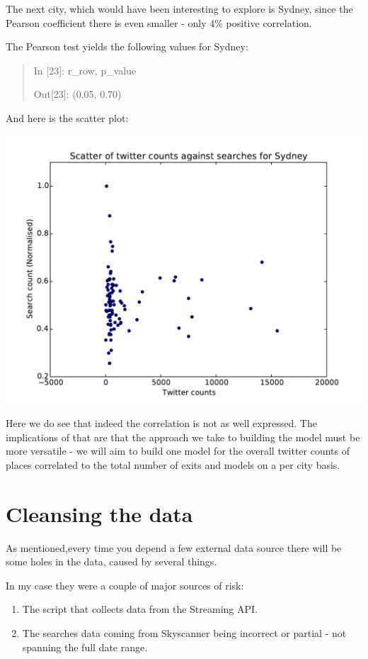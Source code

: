 \documentclass[minf,frontabs,twoside,singlespacing,parskip]{infthesis}
\begin{document}
The next city, which would have been interesting to explore is Sydney, since the Pearson coefficient there is even smaller - only 4\% positive correlation. 

The Pearson test yields the following values for Sydney:
\begin{quotation}
In [23]: r\_row, p\_value

Out[23]: (0.05, 0.70)
\end{quotation}
\newpage
And here is the scatter plot:

\includegraphics[width=\textwidth]{Sydney_scatter}

Here we do see that indeed the correlation is not as well expressed. The implications of that are that the approach we take to building the model must be more versatile - we will aim to build one model for the overall twitter counts of places correlated to the total number of exits and models on a per city basis.

\section{Cleansing the data}

As mentioned,every time you depend a few external data source there will be some holes in the data, caused by several things. 

In my case they were a couple of major sources of risk:
\begin{enumerate}
\item The script that collects data from the Streaming API.
\item The searches data coming from Skyscanner being incorrect or partial - not spanning the full date range.
\end{enumerate}
\end{document}
